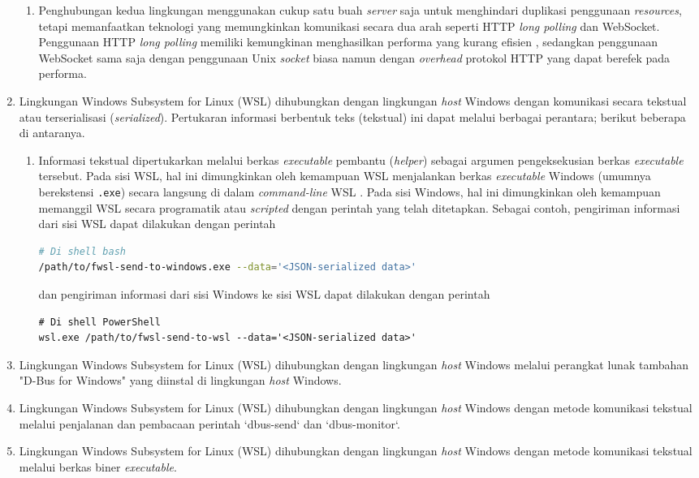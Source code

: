 \begin{enumerate}
\begin{enumerate}
        \item Penghubungan kedua lingkungan menggunakan cukup satu buah \textit{server} saja untuk menghindari duplikasi penggunaan \textit{resources}, tetapi memanfaatkan teknologi yang memungkinkan komunikasi secara dua arah seperti HTTP \textit{long polling} dan WebSocket. Penggunaan HTTP \textit{long polling} memiliki kemungkinan menghasilkan performa yang kurang efisien \cite{problems-in-http-long-polling}, sedangkan penggunaan WebSocket sama saja dengan penggunaan Unix \textit{socket} biasa namun dengan \textit{overhead} protokol HTTP yang dapat berefek pada performa.
    \end{enumerate}
    \item Lingkungan Windows Subsystem for Linux (WSL) dihubungkan dengan lingkungan \textit{host} Windows dengan komunikasi secara tekstual atau terserialisasi (\textit{serialized}). Pertukaran informasi berbentuk teks (tekstual) ini dapat melalui berbagai perantara; berikut beberapa di antaranya.
    \begin{enumerate}
        \item Informasi tekstual dipertukarkan melalui berkas \textit{executable} pembantu (\textit{helper}) sebagai argumen pengeksekusian berkas \textit{executable} tersebut. Pada sisi WSL, hal ini dimungkinkan oleh kemampuan WSL menjalankan berkas \textit{executable} Windows (umumnya berekstensi \verb|.exe|) secara langsung di dalam \textit{command-line} WSL \cite{msdocs-run-windows-tools-from-linux}. Pada sisi Windows, hal ini dimungkinkan oleh kemampuan memanggil WSL secara programatik atau \textit{scripted} dengan perintah yang telah ditetapkan. Sebagai contoh, pengiriman informasi dari sisi WSL dapat dilakukan dengan perintah
        \begin{lstlisting}[language=bash]
# Di shell bash
/path/to/fwsl-send-to-windows.exe --data='<JSON-serialized data>'
        \end{lstlisting}
        dan pengiriman informasi dari sisi Windows ke sisi WSL dapat dilakukan dengan perintah
        \begin{lstlisting}
# Di shell PowerShell
wsl.exe /path/to/fwsl-send-to-wsl --data='<JSON-serialized data>'
        \end{lstlisting}
    \end{enumerate}
    \item Lingkungan Windows Subsystem for Linux (WSL) dihubungkan dengan lingkungan \textit{host} Windows melalui perangkat lunak tambahan "D-Bus for Windows" yang diinstal di lingkungan \textit{host} Windows.
    \item Lingkungan Windows Subsystem for Linux (WSL) dihubungkan dengan lingkungan \textit{host} Windows dengan metode komunikasi tekstual melalui penjalanan dan pembacaan perintah `dbus-send` dan `dbus-monitor`.
    \item Lingkungan Windows Subsystem for Linux (WSL) dihubungkan dengan lingkungan \textit{host} Windows dengan metode komunikasi tekstual melalui berkas biner \textit{executable}.
\end{enumerate}

